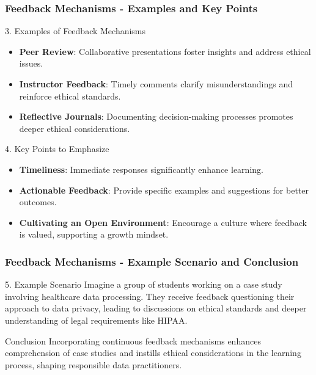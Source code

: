 \documentclass[aspectratio=169]{beamer}
\begin{document}
\begin{frame}[fragile]
    \frametitle{Feedback Mechanisms - Examples and Key Points}
    \begin{block}{3. Examples of Feedback Mechanisms}
        \begin{itemize}
            \item \textbf{Peer Review}: Collaborative presentations foster insights and address ethical issues.
            \item \textbf{Instructor Feedback}: Timely comments clarify misunderstandings and reinforce ethical standards.
            \item \textbf{Reflective Journals}: Documenting decision-making processes promotes deeper ethical considerations.
        \end{itemize}
    \end{block}

    \begin{block}{4. Key Points to Emphasize}
        \begin{itemize}
            \item \textbf{Timeliness}: Immediate responses significantly enhance learning.
            \item \textbf{Actionable Feedback}: Provide specific examples and suggestions for better outcomes.
            \item \textbf{Cultivating an Open Environment}: Encourage a culture where feedback is valued, supporting a growth mindset.
        \end{itemize}
    \end{block}
\end{frame}

\begin{frame}[fragile]
    \frametitle{Feedback Mechanisms - Example Scenario and Conclusion}
    \begin{block}{5. Example Scenario}
        Imagine a group of students working on a case study involving healthcare data processing. They receive feedback questioning their approach to data privacy, leading to discussions on ethical standards and deeper understanding of legal requirements like HIPAA.
    \end{block}

    \begin{block}{Conclusion}
        Incorporating continuous feedback mechanisms enhances comprehension of case studies and instills ethical considerations in the learning process, shaping responsible data practitioners.
    \end{block}
\end{frame}
\end{document}
